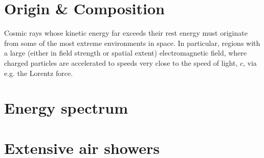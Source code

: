 \section{Origin \& Composition}
\label{sec:cr-origin-and-composition}

Cosmic rays whose kinetic energy far exceeds their rest energy must originate from some of the most extreme environments in space. In particular,
regions with a large (either in field strength or spatial extent) electromagnetic field, where charged particles are accelerated to speeds very
close to the speed of light, $c$, via e.g. the Lorentz force.

\section{Energy spectrum}
\label{sec:cr-energy-spectrum}


\section{Extensive air showers}
\label{sec:extensive-air-showers}








